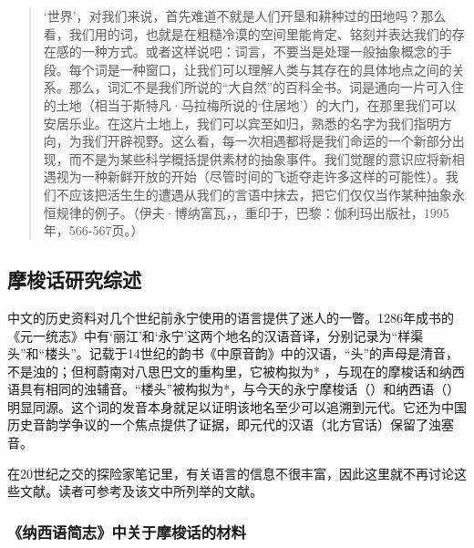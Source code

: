 	\begin{quote}
    ‘世界’，对我们来说，首先难道不就是人们开垦和耕种过的田地吗？那么看，我们用的词，也就是在粗糙冷漠的空间里能肯定、铭刻并表达我们的存在感的一种方式。或者这样说吧：词言，不要当是处理一般抽象概念的手段。每个词是一种窗口，让我们可以理解人类与其存在的具体地点之间的关系。那么，词汇不是我们所说的“大自然”的百科全书。词是通向一片可入住的土地（相当于斯特凡·马拉梅所说的‘住居地’）的大门，在那里我们可以安居乐业。在这片土地上，我们可以宾至如归，熟悉的名字为我们指明方向，为我们开辟视野。这么看，每一次相遇都将是我们命运的一个新部分出现，而不是为某些科学概括提供素材的抽象事件。我们觉醒的意识应将新相遇视为一种新鲜开放的开始（尽管时间的飞逝夺走许多这样的可能性）。我们不应该把活生生的遭遇从我们的言语中抹去，把它们仅仅当作某种抽象永恒规律的例子。（伊夫·博纳富瓦，，重印于，巴黎：伽利玛出版社，1995年，566-567页。）
\end{quote}


\subsection{摩梭话研究综述}
\label{sec:previousstudiesofthenalanguage}


中文的历史资料对几个世纪前永宁使用的语言提供了迷人的一瞥。1286年成书的{《元一统志》}中有‘丽江’和‘永宁’这两个地名的汉语音译，分别记录为“样渠头”和“楼头”。记载于14世纪的韵书{《中原音韵》}中的汉语，“头”的声母是清音，不是浊的；但柯蔚南对八思巴文的重构里，它被构拟为* ，与现在的摩梭话和{纳西}语具有相同的浊辅音\parencite{coblin2007}。“楼头”被构拟为*，与今天的永宁摩梭话（）和{纳西}语（）明显同源。这个词的发音本身就足以证明该地名至少可以追溯到元代。它还为中国历史{音韵学}争议的一个焦点提供了{证据}，即元代的汉语（北方官话）保留了浊塞音\parencite[487]{jacquesetal2011}。

在20世纪之交的探险家笔记里，有关语言的信息不很丰富，因此这里就不再讨论这些文献。读者可参考\textcite{michaudetal2010}及该文中所列举的文献。


\subsubsection{《纳西语简志》中关于摩梭话的材料}
\label{sec:heandjiang1985}

